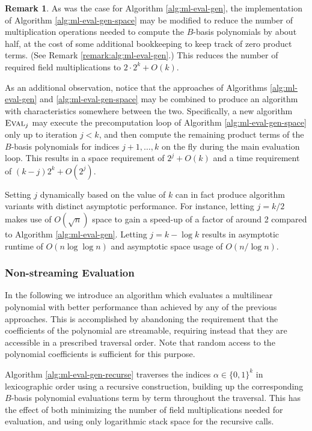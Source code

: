 \documentclass[12pt]{article}
\theoremstyle{plain}
\newcounter{documentcounter}
\theoremstyle{definition}
\newtheorem{remark}[documentcounter]{Remark}
\newcommand*{\fn}[1]{\textsc{{#1}}}
\begin{document}
\begin{remark}
  As was the case for Algorithm \ref{alg:ml-eval-gen}, the implementation of Algorithm \ref{alg:ml-eval-gen-space} may be modified to reduce the number of multiplication operations needed to compute the $B$-basis polynomials by about half, at the cost of some additional bookkeeping to keep track of zero product terms.  (See Remark \ref{remark:alg:ml-eval-gen}.)  This reduces the number of required field multiplications to $2 \cdot 2^k + O(k)$.

  As an additional observation, notice that the approaches of Algorithms \ref{alg:ml-eval-gen} and \ref{alg:ml-eval-gen-space} may be combined to produce an algorithm with characteristics somewhere between the two.  Specifically, a new algorithm $\fn{Eval}_j$ may execute the precomputation loop of Algorithm \ref{alg:ml-eval-gen-space} only up to iteration $j < k$, and then compute the remaining product terms of the $B$-basis polynomials for indices $j+1, \ldots, k$ on the fly during the main evaluation loop.  This results in a space requirement of $2^j + O(k)$ and a time requirement of $(k-j) 2^k + O(2^j)$.

  Setting $j$ dynamically based on the value of $k$ can in fact produce algorithm variants with distinct asymptotic performance.  For instance, letting $j = k/2$ makes use of $O(\sqrt{n})$ space to gain a speed-up of a factor of around 2 compared to Algorithm \ref{alg:ml-eval-gen}.  Letting $j = k - \log k$ results in asymptotic runtime of $O( n \log \log n )$ and asymptotic space usage of $O( n / \log n )$.
\end{remark}


\subsubsection{Non-streaming Evaluation}

In the following we introduce an algorithm which evaluates a multilinear polynomial with better performance than achieved by any of the previous approaches.  This is accomplished by abandoning the requirement that the coefficients of the polynomial are streamable, requiring instead that they are accessible in a prescribed traversal order.  Note that random access to the polynomial coefficients is sufficient for this purpose.

Algorithm \ref{alg:ml-eval-gen-recurse} traverses the indices $\alpha \in \{0, 1\}^k$ in lexicographic order using a recursive construction, building up the corresponding $B$-basis polynomial evaluations term by term throughout the traversal.  This has the effect of both minimizing the number of field multiplications needed for evaluation, and using only logarithmic stack space for the recursive calls.
\end{document}
